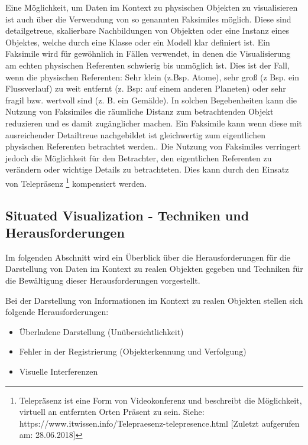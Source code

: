 Eine Möglichkeit, um Daten im Kontext zu physischen Objekten zu visualisieren ist auch über die Verwendung von so genannten Faksimiles möglich. Diese sind detailgetreue, skalierbare Nachbildungen von Objekten oder eine Instanz eines Objektes, welche durch eine Klasse oder ein Modell klar definiert ist. Ein Faksimile wird für gewöhnlich in Fällen verwendet, in denen die Visualisierung am echten physischen Referenten
schwierig bis unmöglich ist. Dies ist der Fall, wenn die physischen Referenten: Sehr klein (z.Bsp. Atome), sehr groß (z Bsp. ein Flussverlauf) zu weit entfernt (z. Bsp: auf einem anderen Planeten) oder sehr fragil bzw. wertvoll sind (z. B. ein Gemälde). 
In solchen Begebenheiten kann die Nutzung von Faksimiles die räumliche Distanz zum betrachtenden Objekt reduzieren und es damit zugänglicher machen. Ein Faksimile kann wenn diese mit ausreichender Detailtreue nachgebildet ist gleichwertig zum eigentlichen physischen Referenten betrachtet werden.. Die Nutzung von Faksimiles verringert jedoch die Möglichkeit für den Betrachter, den eigentlichen Referenten zu verändern oder wichtige Details zu betrachteten. Dies kann durch den Einsatz von Telepräsenz \footnote{Telepräsenz ist eine Form von Videokonferenz und beschreibt die Möglichkeit, virtuell an entfernten Orten Präsent zu sein. Siehe: https://www.itwissen.info/Telepraesenz-telepresence.html [Zuletzt aufgerufen am: 28.06.2018]} kompensiert werden. \cite{Willett2017}


\subsection{Situated Visualization - Techniken und Herausforderungen}

Im folgenden Abschnitt wird ein Überblick über die Herausforderungen für die Darstellung von Daten im Kontext zu realen Objekten 
gegeben und Techniken für die Bewältigung dieser Herausforderungen vorgestellt.

\cite{DieterSchmalstieg2016} Bei der Darstellung von Informationen im Kontext zu realen Objekten stellen sich folgende Herausforderungen:

\begin{itemize}
	\item Überladene Darstellung (Unübersichtlichkeit)
	\item Fehler in der Registrierung (Objekterkennung und Verfolgung)
	\item Visuelle Interferenzen
\end{itemize}


